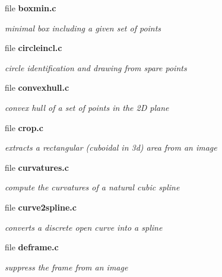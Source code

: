\begin{CompactItemize}
\item 
file {\bf boxmin.c}
\begin{CompactList}\small\item\em minimal box including a given set of points \item\end{CompactList}

\item 
file {\bf circleincl.c}
\begin{CompactList}\small\item\em circle identification and drawing from spare points \item\end{CompactList}

\item 
file {\bf convexhull.c}
\begin{CompactList}\small\item\em convex hull of a set of points in the 2D plane \item\end{CompactList}

\item 
file {\bf crop.c}
\begin{CompactList}\small\item\em extracts a rectangular (cuboidal in 3d) area from an image \item\end{CompactList}

\item 
file {\bf curvatures.c}
\begin{CompactList}\small\item\em compute the curvatures of a natural cubic spline \item\end{CompactList}

\item 
file {\bf curve2spline.c}
\begin{CompactList}\small\item\em converts a discrete open curve into a spline \item\end{CompactList}

\item 
file {\bf deframe.c}
\begin{CompactList}\small\item\em suppress the frame from an image \item\end{CompactList}


\end{CompactItemize}
